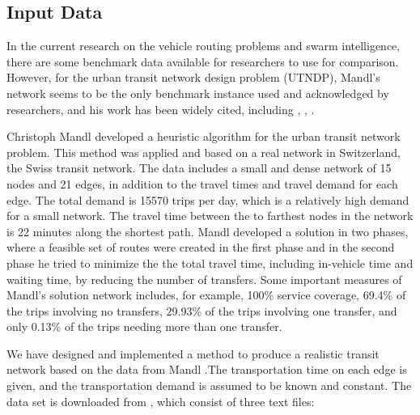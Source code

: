 \subsection{Input Data}

In the current research on the vehicle routing problems and swarm intelligence, there are some benchmark data available for researchers to use for comparison. However, for the urban transit network design problem (UTNDP), Mandl's network seems to be the only benchmark instance used and acknowledged by researchers, and his work has been widely cited, including \citep{fan09}, \citep{kechagiopoulos14}, \citep{nikolic14}. %

Christoph Mandl \citep{mandl79} developed a heuristic algorithm for the urban transit network problem. This method was applied and based on a real network in Switzerland, the Swiss transit network\citep{mandl80}. The data includes a small and dense network of 15 nodes and 21 edges, in addition to the travel times and travel demand for each edge. The total demand is 15570 trips per day, which is a relatively high demand for a small network. The travel time between the to farthest nodes in the network is 22 minutes along the shortest path. Mandl developed a solution in two phases, where a feasible set of routes were created in the first phase and in the second phase he tried to minimize the the total travel time, including in-vehicle time and waiting time, by reducing the number of transfers. Some important measures of Mandl's solution network includes, for example, 100\% service coverage, 69.4\% of the trips involving no transfers, 29.93\% of the trips involving one transfer, and only 0.13\% of the trips needing more than one transfer.

We have designed and implemented a method to produce a realistic transit network based on the data from Mandl \citep{mandl79}.The transportation time on each edge is given, and the transportation demand is assumed to be known and constant.  
The data set is downloaded from \citet{mumford13}, which consist of three text files:


